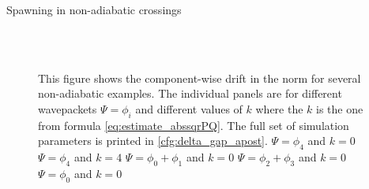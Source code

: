 \begin{chapter}{Spawning in non-adiabatic crossings}
\begin{figure}[h!]
{  } \\
   \\
  \caption[The norm drift for several non-adiabatic examples]{
  This figure shows the component-wise drift in the norm for several non-adiabatic examples.
  The individual panels are for different wavepackets $\Psi = \phi_i$ and different
  values of $k$ where the $k$ is the one from formula \eqref{eq:estimate_abssqrPQ}.
  The full set of simulation parameters is printed in \ref{cfg:delta_gap_apost}.
   $\Psi = \phi_4$ and $k=0$
   $\Psi = \phi_4$ and $k=4$
   $\Psi = \phi_0 + \phi_1$ and $k=0$
   $\Psi = \phi_2 + \phi_3$ and $k=0$
   $\Psi = \phi_0$ and $k=0$
  \label{fig:spawn_delta_gap_norms_drift2}
  }
\end{figure}




\end{chapter}
